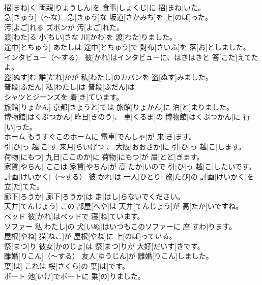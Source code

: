 \documentclass[8pt]{extreport}
\begin{document}
\begin{CJK}{UTF8}{min}
\\	招[まね]く	両親[りょうしん]を 食事[しょくじ]に 招[まね]いた。		
\\	急[きゅう]（～な）	急[きゅう]な 坂道[さかみち]を 上[のぼ]った。		
\\	汚[よご]れる	ズボンが 汚[よご]れた。		
\\	渡[わた]る	小[ちい]さな 川[かわ]を 渡[わた]りました。		
\\	途中[とちゅう]	あたしは 途中[とちゅう]で 財布[さいふ]を 落[お]としました。		
\\	インタビュー（～する）	彼[かれ]はインタビューに、はきはきと 答[こた]えてたよ。		
\\	盗[ぬす]む	誰[だれ]かが 私[わたし]のカバンを 盗[ぬす]みました。		
\\	普段[ふだん]	私[わたし]は 普段[ふだん]は
\\	シャツとジーンズを 着[き]ています。		
\\	旅館[りょかん]	京都[きょうと]では 旅館[りょかん]に 泊[と]まりました。		
\\	博物館[はくぶつかん]	昨日[きのう]、 車[くるま]の 博物館[はくぶつかん]に 行[い]った。		
\\	ホーム	もうすぐこのホームに 電車[でんしゃ]が 来[き]ます。		
\\	引[ひ]っ 越[こ]す	来月[らいげつ]、 大阪[おおさか]に 引[ひ]っ 越[こ]します。		
\\	荷物[にもつ]	九日[ここのか]に 荷物[にもつ]が 届[とど]きます。		
\\	家賃[やちん]	ここは 家賃[やちん]が 高[たか]いので 引[ひ]っ 越[こ]したいです。		
\\	計画[けいかく]（～する）	彼[かれ]は 一人[ひとり] 旅[たび]の 計画[けいかく]を 立[た]てた。		
\\	廊下[ろうか]	廊下[ろうか]は 走[はし]らないでください。		
\\	天井[てんじょう]	この 部屋[へや]は 天井[てんじょう]が 高[たか]いですね。		
\\	ベッド	彼[かれ]はベッドで 寝[ね]ています。		
\\	ソファー	私[わたし]の 犬[いぬ]はいつもこのソファーに 座[すわ]ります。		
\\	屋根[やね]	猫[ねこ]が 屋根[やね]に 上[のぼ]っている。		
\\	祭[まつ]り	彼女[かのじょ]は 祭[まつ]りが 大好[だいす]きです。		
\\	離婚[りこん]（～する）	友人[ゆうじん]が 離婚[りこん]しました。		
\\	葉[は]	これは 桜[さくら]の 葉[は]です。		
\\	ボート	池[いけ]でボートに 乗[の]りました。		

\end{CJK}
\end{document}
